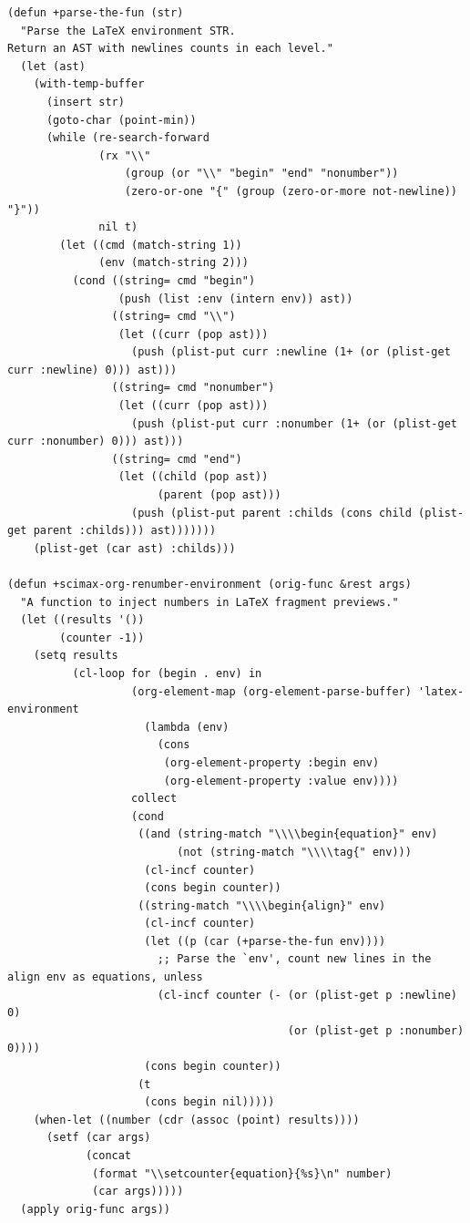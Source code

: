 \documentclass[11pt]{article}
\begin{document}
\begin{verbatim}
(defun +parse-the-fun (str)
  "Parse the LaTeX environment STR.
Return an AST with newlines counts in each level."
  (let (ast)
    (with-temp-buffer
      (insert str)
      (goto-char (point-min))
      (while (re-search-forward
              (rx "\\"
                  (group (or "\\" "begin" "end" "nonumber"))
                  (zero-or-one "{" (group (zero-or-more not-newline)) "}"))
              nil t)
        (let ((cmd (match-string 1))
              (env (match-string 2)))
          (cond ((string= cmd "begin")
                 (push (list :env (intern env)) ast))
                ((string= cmd "\\")
                 (let ((curr (pop ast)))
                   (push (plist-put curr :newline (1+ (or (plist-get curr :newline) 0))) ast)))
                ((string= cmd "nonumber")
                 (let ((curr (pop ast)))
                   (push (plist-put curr :nonumber (1+ (or (plist-get curr :nonumber) 0))) ast)))
                ((string= cmd "end")
                 (let ((child (pop ast))
                       (parent (pop ast)))
                   (push (plist-put parent :childs (cons child (plist-get parent :childs))) ast)))))))
    (plist-get (car ast) :childs)))

(defun +scimax-org-renumber-environment (orig-func &rest args)
  "A function to inject numbers in LaTeX fragment previews."
  (let ((results '())
        (counter -1))
    (setq results
          (cl-loop for (begin . env) in
                   (org-element-map (org-element-parse-buffer) 'latex-environment
                     (lambda (env)
                       (cons
                        (org-element-property :begin env)
                        (org-element-property :value env))))
                   collect
                   (cond
                    ((and (string-match "\\\\begin{equation}" env)
                          (not (string-match "\\\\tag{" env)))
                     (cl-incf counter)
                     (cons begin counter))
                    ((string-match "\\\\begin{align}" env)
                     (cl-incf counter)
                     (let ((p (car (+parse-the-fun env))))
                       ;; Parse the `env', count new lines in the align env as equations, unless
                       (cl-incf counter (- (or (plist-get p :newline) 0)
                                           (or (plist-get p :nonumber) 0))))
                     (cons begin counter))
                    (t
                     (cons begin nil)))))
    (when-let ((number (cdr (assoc (point) results))))
      (setf (car args)
            (concat
             (format "\\setcounter{equation}{%s}\n" number)
             (car args)))))
  (apply orig-func args))


\end{verbatim}
\end{document}
